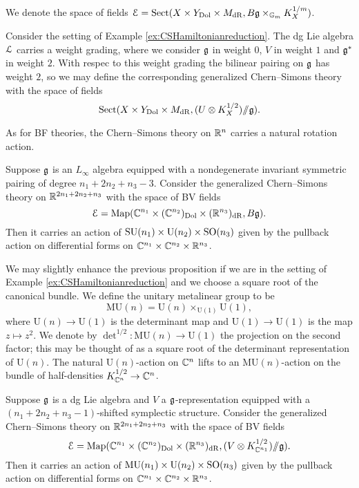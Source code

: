 \documentclass[10pt, oneside]{article}
\newcommand{\Gm}{\mathbb{G}_m}
\newcommand{\MU}{\mathrm{MU}}
\newcommand{\Sect}{\mathrm{Sect}}
\renewcommand{\U}{\mathrm{U}}
\newcommand{\ham}{/\!\!/}
\begin{document}
We denote the space of fields $\cE = \Sect(X\times Y_{\mr{Dol}}\times M_{\mr{dR}}, B \fg\times_{\Gm} K_X^{1/m})$.

\begin{example}
Consider the setting of Example \ref{ex:CSHamiltonianreduction}. The dg Lie algebra $\mathcal L$ carries a weight grading, where we consider $\mathfrak g$ in weight 0, $V$ in weight $1$ and $\mathfrak g^*$ in weight $2$. With respec to this weight grading the bilinear pairing on $\mathfrak g$ has weight $2$, so we may define the corresponding generalized Chern--Simons theory with the space of fields
\[\Sect(X\times Y_{\mr{Dol}}\times M_{\mr{dR}}, (U\otimes K_X^{1/2})\ham \fg).\]
\end{example}

As for BF theories, the Chern--Simons theory on $\mathbb R^n$ carries a natural rotation action.

\begin{prop}
Suppose $\mathfrak g$ is an $L_\infty$ algebra equipped with a nondegenerate invariant symmetric pairing of degree $n_1+2n_2+n_3-3$. Consider the generalized Chern--Simons theory on $\mathbb R^{2n_1+2n_2+n_3}$ with the space of BV fields
\[\mathcal E = \operatorname{Map}(\mathbb C^{n_1}\times (\mathbb C^{n_2})_{\mathrm{Dol}}\times (\mathbb R^{n_3})_{\mathrm{dR}}, B\mathfrak g).\]
Then it carries an action of $\SU(n_1)\times \U(n_2)\times \SO(n_3)$ given by the pullback action on differential forms on $\mathbb C^{n_1}\times \mathbb C^{n_2}\times \mathbb R^{n_3}$.
\end{prop}

We may slightly enhance the previous proposition if we are in the setting of Example \ref{ex:CSHamiltonianreduction} and we choose a square root of the canonical bundle. We define the unitary metalinear group to be
\[\MU(n) = \U(n)\times_{\U(1)} \U(1),\]
where $\U(n)\rightarrow \U(1)$ is the determinant map and $\U(1)\rightarrow \U(1)$ is the map $z\mapsto z^2$. We denote by $\det^{1/2}\colon \MU(n)\rightarrow \U(1)$ the projection on the second factor; this may be thought of as a square root of the determinant representation of $\U(n)$. The natural $\U(n)$-action on $\mathbb C^n$ lifts to an $\MU(n)$-action on the bundle of half-densities $K_{\mathbb C^n}^{1/2}\rightarrow \mathbb C^n$.

\begin{prop}
Suppose $\mathfrak g$ is a dg Lie algebra and $V$ a $\mathfrak g$-representation equipped with a $(n_1+2n_2+n_3-1)$-shifted symplectic structure. Consider the generalized Chern--Simons theory on $\mathbb R^{2n_1+2n_2+n_3}$ with the space of BV fields
\[\cE = \map(\CC^{n_1}\times (\CC^{n_2})_{\mr{Dol}}\times (\RR^{n_3})_{\mr{dR}}, (V\otimes K_{\CC^{n_1}}^{1/2})\ham\fg).\]
Then it carries an action of $\MU(n_1)\times \U(n_2)\times \SO(n_3)$ given by the pullback action on differential forms on $\mathbb C^{n_1}\times \mathbb C^{n_2}\times \mathbb R^{n_3}$.
\end{prop}
\end{document}
